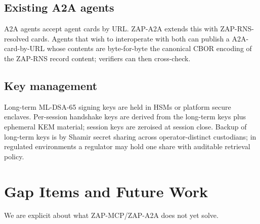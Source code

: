 \documentclass[11pt,a4paper]{article}
\theoremstyle{definition}
\theoremstyle{remark}
\newcommand{\zapmcp}{\textsf{ZAP-MCP}\xspace}
\newcommand{\zapaa}{\textsf{ZAP-A2A}\xspace}
\newcommand{\aatwo}{\textsf{A2A}\xspace}
\newcommand{\rns}{\textsf{ZAP-RNS}\xspace}
\begin{document}
\subsection{Existing \aatwo{} agents}

\aatwo{} agents accept agent cards by URL. \zapaa{} extends this with
\rns{}-resolved cards. Agents that wish to interoperate with both can
publish a \aatwo{}-card-by-URL whose contents are byte-for-byte the
canonical CBOR encoding of the \rns{} record content; verifiers can
then cross-check.

\subsection{Key management}

Long-term ML-DSA-65 signing keys are held in HSMs or platform secure
enclaves. Per-session handshake keys are derived from the long-term keys
plus ephemeral KEM material; session keys are zeroised at session
close. Backup of long-term keys is by Shamir secret sharing across
operator-distinct custodians; in regulated environments a regulator
may hold one share with auditable retrieval policy.

\section{Gap Items and Future Work}\label{sec:gaps}

We are explicit about what \zapmcp{}/\zapaa{} does not yet solve.
\end{document}
